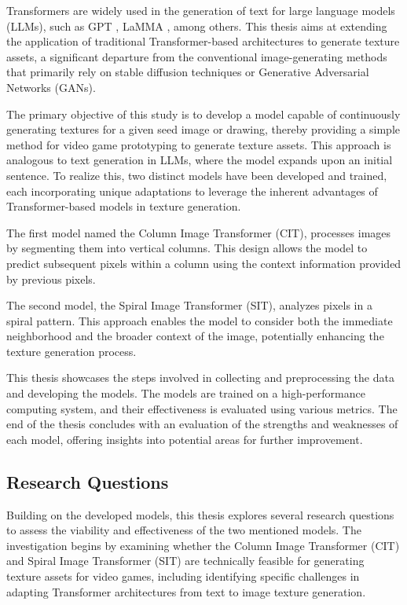 
Transformers are widely used in the generation of text for large language models (LLMs), such as GPT \autocite{GPT2radford2019}, LaMMA \autocite{touvron2023llama}, among others. This thesis aims at extending the application of traditional Transformer-based architectures to generate texture assets, a significant departure from the conventional image-generating methods that primarily rely on stable diffusion techniques or Generative Adversarial Networks (GANs).

The primary objective of this study is to develop a model capable of continuously generating textures for a given seed image or drawing, thereby providing a simple method for video game prototyping to generate texture assets. This approach is analogous to text generation in LLMs, where the model expands upon an initial sentence. To realize this, two distinct models have been developed and trained, each incorporating unique adaptations to leverage the inherent advantages of Transformer-based models in texture generation.

The first model named the Column Image Transformer (CIT), processes images by segmenting them into vertical columns. This design allows the model to predict subsequent pixels within a column using the context information provided by previous pixels.

The second model, the Spiral Image Transformer (SIT), analyzes pixels in a spiral pattern. This approach enables the model to consider both the immediate neighborhood and the broader context of the image, potentially enhancing the texture generation process.

This thesis showcases the steps involved in collecting and preprocessing the data and developing the models. The models are trained on a high-performance computing system, and their effectiveness is evaluated using various metrics. The end of the thesis concludes with an evaluation of the strengths and weaknesses of each model, offering insights into potential areas for further improvement.

\subsection{Research Questions}

Building on the developed models, this thesis explores several research questions to assess the viability and effectiveness of the two mentioned models. The investigation begins by examining whether the Column Image Transformer (CIT) and Spiral Image Transformer (SIT) are technically feasible for generating texture assets for video games, including identifying specific challenges in adapting Transformer architectures from text to image texture generation.

